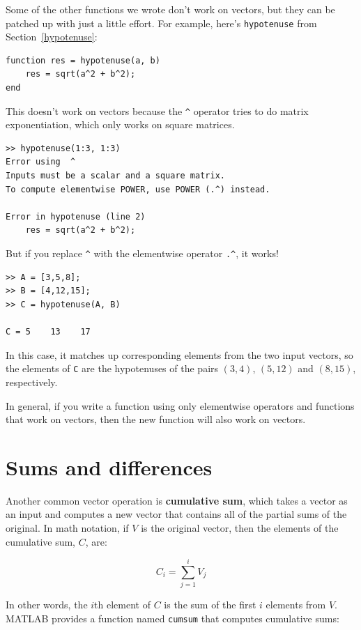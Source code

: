 \documentclass{book}
\begin{document}
Some of the other functions we wrote don't work on vectors,
but they can be patched up with just a little effort.  For example,
here's {\tt hypotenuse} from Section~\ref{hypotenuse}:

\begin{verbatim}
function res = hypotenuse(a, b)
    res = sqrt(a^2 + b^2);
end
\end{verbatim}

This doesn't work on vectors because the \verb+^+ operator
tries to do matrix exponentiation, which only works on
square matrices.

\begin{verbatim}
>> hypotenuse(1:3, 1:3)
Error using  ^
Inputs must be a scalar and a square matrix.
To compute elementwise POWER, use POWER (.^) instead.

Error in hypotenuse (line 2)
    res = sqrt(a^2 + b^2);
\end{verbatim}

But if you replace \verb+^+ with the elementwise operator
\verb+.^+, it works!

\begin{verbatim}
>> A = [3,5,8];
>> B = [4,12,15];
>> C = hypotenuse(A, B)

C = 5    13    17
\end{verbatim}

In this case, it matches up corresponding elements from the two
input vectors, so the elements of {\tt C} are the hypotenuses of
the pairs $(3,4)$, $(5,12)$ and $(8,15)$, respectively.

In general, if you write a function using only elementwise
operators and functions that work on vectors, then the new
function will also work on vectors.


\section{Sums and differences}

Another common vector operation is {\bf cumulative sum}, which takes a
vector as an input and computes a new vector that contains all of the
partial sums of the original.  In math notation, if $V$ is the
original vector, then the elements of the cumulative sum, $C$, are:

\begin{equation}
C_i = \sum_{j=1}^i V_j
\end{equation}

In other words, the $i$th element of $C$ is the sum of the first
$i$ elements from $V$.  MATLAB provides a function named {\tt cumsum}
that computes cumulative sums:
\end{document}
